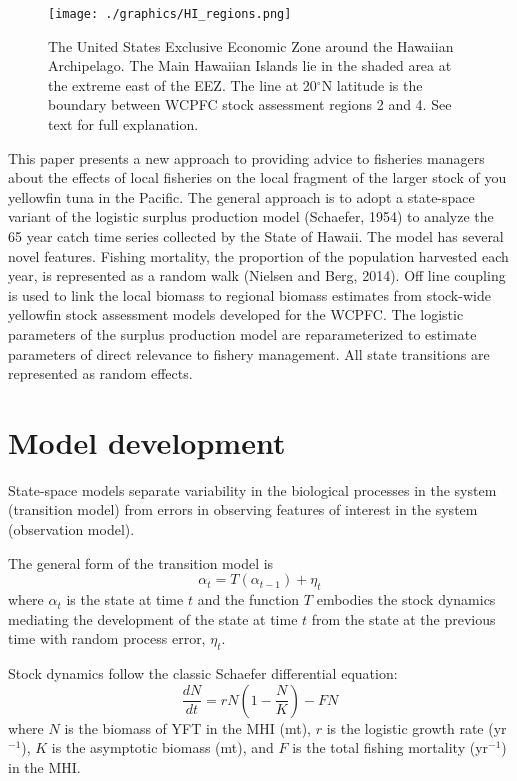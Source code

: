 \documentclass[12pt,letterpaper]{article}
\renewcommand\deg[1]{$^\circ$#1}
\newcommand\peryr{yr$^{-1}$}
\begin{document}
\begin{figure}
\begin{center}
\texttt{[image: ./graphics/HI\_regions.png]}
\caption{\label{fig:mhimap}
The United States Exclusive Economic Zone around the Hawaiian
Archipelago. The Main Hawaiian Islands lie in the shaded area at the
extreme east of the EEZ. The line at 20\deg{N} latitude is the
boundary between WCPFC stock assessment regions 2 and 4. See text for
full explanation.
}
\end{center}
\end{figure}

This paper presents a new approach to providing advice to fisheries
managers about the effects of local fisheries on the local fragment of
the larger stock of you yellowfin tuna in the Pacific.
The general approach is to adopt a state-space variant of
the logistic surplus production model  (Schaefer, 1954) to analyze the 65 year
catch time series collected by the State of Hawaii. 
The model has several novel features.
Fishing mortality, the proportion of the population harvested each
year, is represented as a random walk (Nielsen and Berg, 2014).
Off line coupling is used to link the local biomass to regional
biomass estimates from stock-wide yellowfin stock assessment models
developed for the WCPFC.
The logistic parameters of the surplus production model are
reparameterized to estimate parameters of direct relevance to fishery
management. All state transitions are represented as random effects.


\section*{Model development}
\label{sec:models}
State-space models separate variability in the biological
processes in the system (transition model)
from errors in observing features of interest
in the system (observation model).

The general form of the transition model is
\begin{equation}
\alpha_t=T(\alpha_{t-1}) + \eta_t
\end{equation}
where $\alpha_t$ is the state at time $t$ and 
the function $T$ embodies the stock dynamics mediating the
development of the state at time $t$ from the state at the previous
time with random process error, $\eta_t$.

Stock dynamics follow the classic Schaefer differential equation:
\begin{equation}
\label{eqn:ischaefer}
\frac{dN}{dt} = rN(1-\frac{N}{K}) - FN
\end{equation}
where $N$ is the biomass of YFT in the MHI (mt), 
$r$ is the logistic growth rate (\peryr),
$K$ is the asymptotic biomass (mt), and
$F$ is the total fishing mortality (\peryr) in the MHI.
\end{document}

